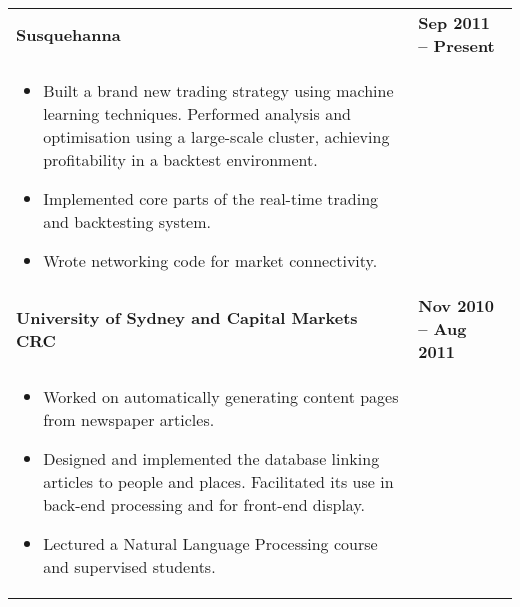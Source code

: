\documentclass[]{article}
\begin{document}
\begin{table*}[h!]
\begin{tabular}[h!]{p{12.7cm}l}

\textbf{Susquehanna} & \textbf{Sep 2011 -- Present}\\
\begin{itemize}[noitemsep,topsep=0pt]
\item {Built a brand new trading strategy using machine learning techniques. Performed analysis and optimisation using a large-scale cluster, achieving profitability in a backtest environment.}
\item {Implemented core parts of the real-time trading and backtesting system.}
\item {Wrote networking code for market connectivity.}
\end{itemize}
& \\

\textbf{University of Sydney and Capital Markets CRC} & \textbf{Nov 2010 -- Aug 2011}\\
\begin{itemize}[noitemsep,topsep=0pt]
\item {Worked on automatically generating content pages from newspaper articles.}
\item {Designed and implemented the database linking articles to people and places. Facilitated its use in back-end processing and for front-end display.}
\item {Lectured a Natural Language Processing course and supervised students.}
\end{itemize}
& \\


\end{tabular}
\end{table*}
\end{document}
